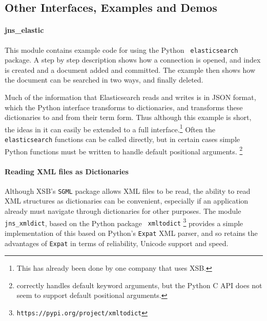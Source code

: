 \begin{description}



\end{description}

\subsection{Other Interfaces, Examples and Demos}

\paragraph{jns\_elastic}
This module contains example code for using the Python {\tt
  elasticsearch} package.  A step by step description shows how a
connection is opened, and index is created and a document added and
committed.  The example then shows how the document can be searched in
two ways, and finally deleted.

Much of the information that Elasticsearch reads and writes is in JSON
format, which the Python interface transforms to dictionaries, and
\janus{} transforms these dictionaries to and from their term form.
Thus although this example is short, the ideas in it can easily be
extended to a full interface.\footnote{This has already been done by
one company that uses XSB.}  Often the {\tt elasticsearch} functions
can be called directly, but in certain cases simple Python functions
must be written to handle default positional
arguments. \footnote{\janus{} correctly handles default keyword
arguments, but the Python C API does not seem to support default
positional arguments.}



\paragraph{Reading XML files as \janus{} Dictionaries}
%
Although XSB's {\tt SGML} package allows XML files to be read, the
ability to read XML structures as \janus{} dictionaries can be
convenient, especially if an application already must navigate through
\janus{} dictionaries for other purposes.  The module {\tt
  jns\_xmldict}, based on the Python package {\tt
  xmltodict} \footnote{{\tt https://pypi.org/project/xmltodict}}
provides a simple implementation of this based on Python's {\tt Expat}
XML parser, and so retains the advantages of {\tt Expat} in terms of
reliability, Unicode support and speed.

